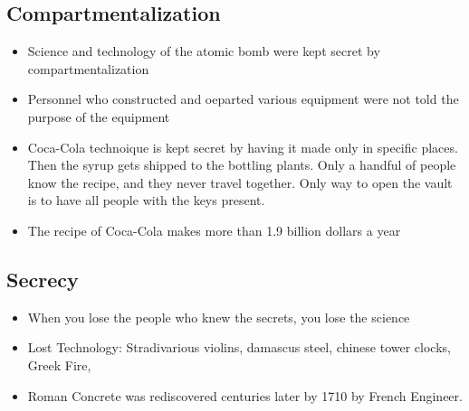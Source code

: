 \documentclass{article}
\begin{document}
\subsection{Compartmentalization}
\begin{itemize}
  \item Science and technology of the atomic bomb were kept secret
    by compartmentalization
  \item Personnel who constructed and oeparted various equipment
    were not told the purpose of the equipment
  \item Coca-Cola technoique is kept secret by having it made only in specific places.
    Then the syrup gets shipped to the bottling plants.
    Only a handful of people know the recipe, and they never travel together.
    Only way to open the vault is to have all people with the keys present.
  \item The recipe of Coca-Cola makes more than 1.9 billion dollars a year
\end{itemize}

\subsection{Secrecy}
\begin{itemize}
  \item When you lose the people who knew the secrets,
    you lose the science
  \item Lost Technology: Stradivarious violins, damascus steel, chinese tower clocks, Greek Fire,
  \item Roman Concrete was rediscovered centuries later by 1710 by French Engineer.
\end{itemize}
\end{document}
